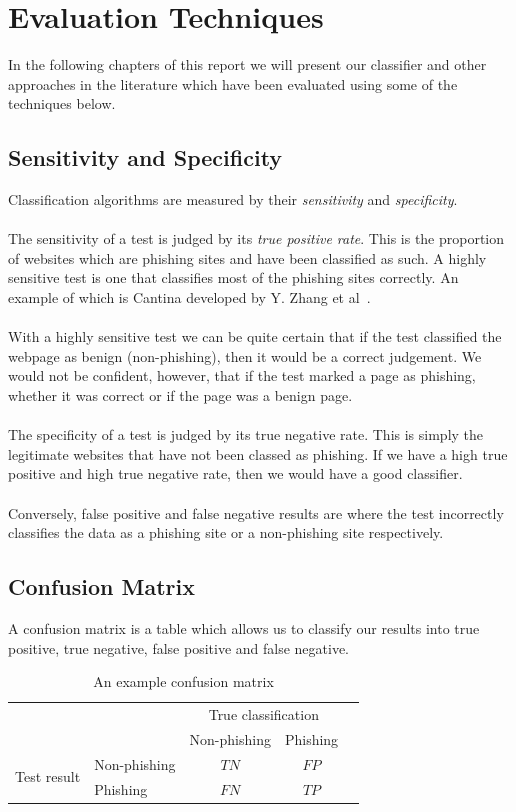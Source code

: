 \documentclass[12pt,twoside]{report}
\begin{document}
\chapter{Evaluation Techniques}
In the following chapters of this report we will present our classifier and other approaches in the literature which have been evaluated using some of the techniques below.
\section{Sensitivity and Specificity}
Classification algorithms are measured by their \textit{sensitivity} and \textit{specificity}.
\\\\
The sensitivity of a test is judged by its \textit{true positive rate}. This is the proportion of websites which are phishing sites and have been classified as such. A highly sensitive test is one that classifies most of the phishing sites correctly. An example of which is Cantina developed by Y. Zhang et al~\cite{cantina}.
\\\\
With a highly sensitive test we can be quite certain that if the test classified the webpage as benign (non-phishing), then it would be a correct judgement. We would not be confident, however, that if the test marked a page as phishing, whether it was correct or if the page was a benign page.
\\\\
The specificity of a test is judged by its true negative rate. This is simply the legitimate websites that have not been classed as phishing. If we have a high true positive and high true negative rate, then we would have a good classifier.
\\\\
Conversely, false positive and false negative results are where the test incorrectly classifies the data as a phishing site or a non-phishing site respectively.
\\
\clearpage
\section{Confusion Matrix}
A confusion matrix is a table which allows us to classify our results into true positive, true negative, false positive and false negative.
\begin{table}[h]
\begin{center}
\begin{tabular}{l|l|c|c|c}
\multicolumn{2}{c}{}&\multicolumn{2}{c}{True classification}&\\
\cline{3-4}
\multicolumn{2}{c|}{}&Non-phishing&Phishing\\
\cline{2-4}
\multirow{2}{*}{Test result}& Non-phishing & $TN$ & $FP$\\
\cline{2-4}
& Phishing & $FN$ & $TP$\\
\cline{2-4}
\end{tabular}
\end{center}
\caption{An example confusion matrix}
\label{table:confusionmatrix}
\end{table}
\end{document}
